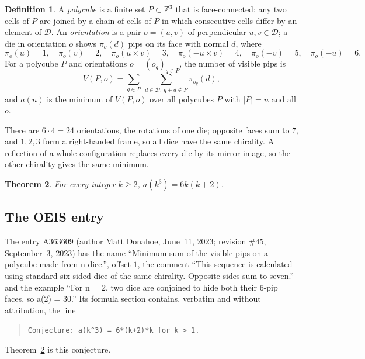 \documentclass[11pt]{amsart}
\theoremstyle{plain}
\newtheorem{theorem}{Theorem}
\theoremstyle{definition}
\newtheorem{definition}[theorem]{Definition}
\newcommand{\Z}{\mathbb{Z}}
\newcommand{\D}{\mathcal{D}}
\begin{document}
\begin{definition}\label{def:main}
A \emph{polycube} is a finite set $P\subset\Z^3$ that is face-connected: any two cells of $P$ are joined by a chain of cells of $P$ in which consecutive cells differ by an element of $\D$. An \emph{orientation} is a pair $o=(u,v)$ of perpendicular $u,v\in\D$; a die in orientation $o$ shows $\pi_o(d)$ pips on its face with normal $d$, where
\[
\pi_o(u)=1,\quad \pi_o(v)=2,\quad \pi_o(u\times v)=3,\quad \pi_o(-u\times v)=4,\quad \pi_o(-v)=5,\quad \pi_o(-u)=6.
\]
For a polycube $P$ and orientations $o=(o_q)_{q\in P}$, the number of visible pips is
\[
V(P,o)=\sum_{q\in P}\ \sum_{d\in\D,\ q+d\notin P}\pi_{o_q}(d),
\]
and $a(n)$ is the minimum of $V(P,o)$ over all polycubes $P$ with $|P|=n$ and all $o$.
\end{definition}

There are $6\cdot4=24$ orientations, the rotations of one die; opposite faces sum to $7$, and $1,2,3$ form a right-handed frame, so all dice have the same chirality. A reflection of a whole configuration replaces every die by its mirror image, so the other chirality gives the same minimum.

\begin{theorem}\label{thm:main}
For every integer $k\ge2$, $a(k^3)=6k(k+2)$.
\end{theorem}

\subsection*{The OEIS entry}
The entry A363609 \cite{A363609} (author Matt Donahoe, June~11, 2023; revision \#45, September~3, 2023) has the name ``Minimum sum of the visible pips on a polycube made from n dice.'', offset $1$, the comment ``This sequence is calculated using standard six-sided dice of the same chirality. Opposite sides sum to seven.'' and the example ``For n = 2, two dice are conjoined to hide both their 6-pip faces, so a(2) = 30.'' Its formula section contains, verbatim and without attribution, the line
\begin{quote}\raggedright
\texttt{Conjecture: a(k\^{}3) = 6*(k+2)*k for k > 1.}
\end{quote}
Theorem~\ref{thm:main} is this conjecture.
\end{document}
